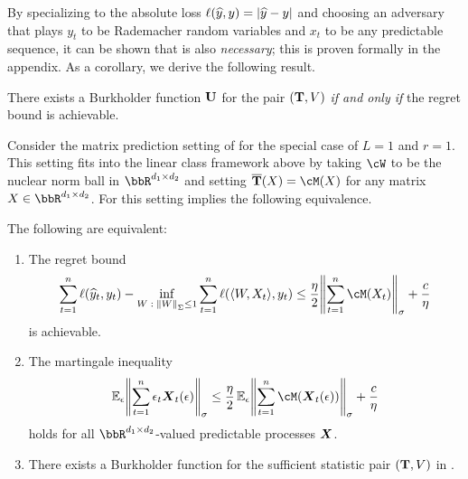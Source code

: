 By specializing to the absolute loss $\ls(\yh, y)=\abs*{\yh-y}$ and choosing an adversary that plays $y_{t}$ to be Rademacher random variables and $x_{t}$ to be any predictable sequence, it can be shown that  is also \emph{necessary}; this is proven formally in the appendix. As a corollary, we derive the following result.
\begin{proposition}
\label{prop:necessary}
There exists a Burkholder function $\burk$ for the pair $(\suff, V)$ \emph{if and only if} the regret bound  is achievable.
\end{proposition}
 Consider the matrix prediction setting of  for the special case of $L=1$ and $r=1$. This setting fits into the linear class framework above by taking $\cW$ to be the nuclear norm ball in $\bbR^{d_1\times{}d_2}$ and setting $\overline{\suff}(X)=\cM(X)$ for any matrix $X\in\bbR^{d_1\times{}d_2}$. For this setting  implies the following equivalence.
\begin{example}
The following are equivalent:
\begin{enumerate}
\item The regret bound
\[
\sum_{t=1}^{n}\ls(\yh_t, y_t) - \inf_{W\;:\;\nrm*{W}_{\Sigma}\leq{}1}\sum_{t=1}^n \loss(\tri*{W,X_t},y_t) \leq{} \frac{\eta{}}{2}\nrm*{\sum_{t=1}^{n}\cM(X_t)}_{\sigma} + \frac{c}{\eta}
\]
is achievable.
\item The martingale inequality
\[
\En_{\eps}\nrm*{\sum_{t=1}^{n}\eps_t\mb{X}_{t}(\eps)}_{\sigma} \leq{} \frac{\eta{}}{2}\En_{\eps}\nrm*{\sum_{t=1}^{n}\cM(\mb{X}_t(\eps))}_{\sigma} + \frac{c}{\eta}
\]
holds for all $\bbR^{d_1\times{}d_2}$-valued predictable processes $\mb{X}$.
\item There exists a Burkholder function for the sufficient statistic pair $(\suff, V)$ in .
\end{enumerate}

\end{example}

